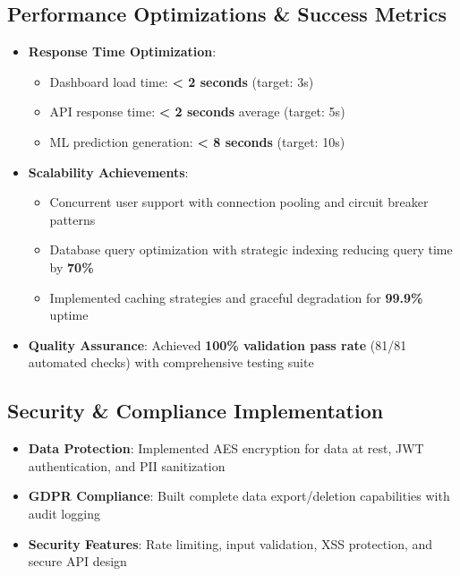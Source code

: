\documentclass[11pt]{article}
\begin{document}
\subsection*{Performance Optimizations \& Success Metrics}
\begin{itemize}[leftmargin=*]
    \item \textbf{Response Time Optimization}: 
        \begin{itemize}
            \item Dashboard load time: \textbf{< 2 seconds} (target: 3s)
            \item API response time: \textbf{< 2 seconds} average (target: 5s)
            \item ML prediction generation: \textbf{< 8 seconds} (target: 10s)
        \end{itemize}
    \item \textbf{Scalability Achievements}:
        \begin{itemize}
            \item Concurrent user support with connection pooling and circuit breaker patterns
            \item Database query optimization with strategic indexing reducing query time by \textbf{70\%}
            \item Implemented caching strategies and graceful degradation for \textbf{99.9\%} uptime
        \end{itemize}
    \item \textbf{Quality Assurance}: Achieved \textbf{100\% validation pass rate} (81/81 automated checks) with comprehensive testing suite
\end{itemize}

\subsection*{Security \& Compliance Implementation}
\begin{itemize}[leftmargin=*]
    \item \textbf{Data Protection}: Implemented AES encryption for data at rest, JWT authentication, and PII sanitization
    \item \textbf{GDPR Compliance}: Built complete data export/deletion capabilities with audit logging
    \item \textbf{Security Features}: Rate limiting, input validation, XSS protection, and secure API design
\end{itemize}
\end{document}
